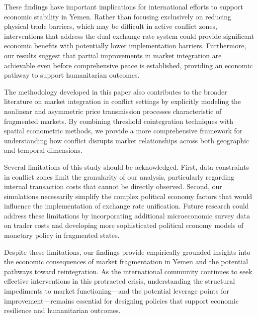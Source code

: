 These findings have important implications for international efforts to support economic stability in Yemen. Rather than focusing exclusively on reducing physical trade barriers, which may be difficult in active conflict zones, interventions that address the dual exchange rate system could provide significant economic benefits with potentially lower implementation barriers. Furthermore, our results suggest that partial improvements in market integration are achievable even before comprehensive peace is established, providing an economic pathway to support humanitarian outcomes.

The methodology developed in this paper also contributes to the broader literature on market integration in conflict settings by explicitly modeling the nonlinear and asymmetric price transmission processes characteristic of fragmented markets. By combining threshold cointegration techniques with spatial econometric methods, we provide a more comprehensive framework for understanding how conflict disrupts market relationships across both geographic and temporal dimensions.

Several limitations of this study should be acknowledged. First, data constraints in conflict zones limit the granularity of our analysis, particularly regarding internal transaction costs that cannot be directly observed. Second, our simulations necessarily simplify the complex political economy factors that would influence the implementation of exchange rate unification. Future research could address these limitations by incorporating additional microeconomic survey data on trader costs and developing more sophisticated political economy models of monetary policy in fragmented states.

Despite these limitations, our findings provide empirically grounded insights into the economic consequences of market fragmentation in Yemen and the potential pathways toward reintegration. As the international community continues to seek effective interventions in this protracted crisis, understanding the structural impediments to market functioning—and the potential leverage points for improvement—remains essential for designing policies that support economic resilience and humanitarian outcomes.